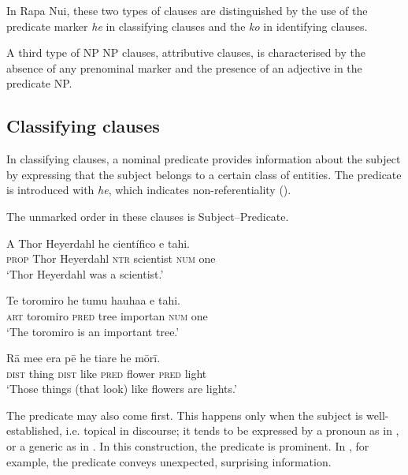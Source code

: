 In Rapa Nui, these two types of clauses are distinguished by the use of the predicate marker \textit{he} in classifying clauses and the  \textit{ko} in identifying clauses.

A third type of NP NP clauses, attributive clauses, is characterised by the absence of any prenominal marker and the presence of an adjective in the predicate NP.

\subsection{Classifying clauses}\label{sec:9.2.1}
In classifying clauses, a nominal predicate provides information about the subject by expressing that the subject belongs to a certain class of entities. The predicate is introduced with \textit{he}, which indicates non-referentiality ().

The unmarked order in these clauses is Subject–Predicate.

\ea\label{ex:9.1}
\gll A Thor Heyerdahl he científico e tahi.\\
\textsc{prop} Thor Heyerdahl \textsc{ntr} scientist \textsc{num} one\\

\glt 
‘Thor Heyerdahl was a scientist.’ \textstyleExampleref{[R376.007]} 
\z

\ea\label{ex:9.2}
\gll Te toromiro he tumu hauha{\ꞌ}a e tahi. \\
\textsc{art} toromiro \textsc{pred} tree importan \textsc{num} one \\

\glt 
‘The toromiro is an important tree.’ \textstyleExampleref{[R478.053]} 
\z

\ea\label{ex:9.3}
\gll Rā me{\ꞌ}e era pē he tiare he mōrī. \\
\textsc{dist} thing \textsc{dist} like \textsc{pred} flower \textsc{pred} light \\

\glt
‘Those things (that look) like flowers are lights.’ \textstyleExampleref{[R210.199]} 
\z

The predicate may also come first. This happens only when the subject is well-es\-tab\-lished, i.e. topical in discourse; it tends to be expressed by a pronoun as in , or a generic  as in . In this construction, the predicate is prominent. In , for example, the predicate conveys unexpected, surprising information.

